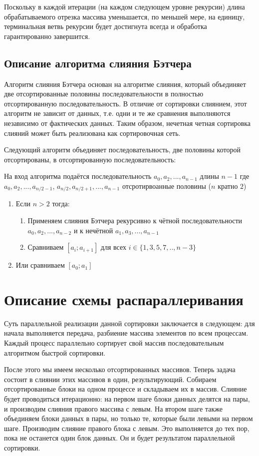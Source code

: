 \documentclass[oneside,final,14pt]{extreport}
\begin{document}
Поскольку в каждой итерации (на каждом следующем уровне рекурсии) длина обрабатываемого отрезка массива уменьшается, по меньшей мере, на единицу, терминальная ветвь рекурсии будет достигнута всегда и обработка гарантированно завершится.        

\section{Описание алгоритма слияния Бэтчера}

Алгоритм слияния Бэтчера  основан на алгоритме слияния, который
объединяет две отсортированные половины последовательности в полностью отсортированную последовательность.
В отличие от сортировки слиянием, этот алгоритм не зависит от данных, т.е. одни и те же сравнения выполняются независимо от фактических данных. Таким образом, нечетная четная сортировка слияний может быть реализована как сортировочная сеть.


Следующий алгоритм объединяет последовательность, две половины которой отсортированы, в отсортированную последовательность:
\bigskip

На вход алгоритма подаётся последовательность \(a_0,a_2,...,a_{n-1}\) длины \(n-1\) где \(a_0,a_2,...,a_{n/2 - 1}\), \(a_{n/2},a_{n/2 + 1},...,a_{n-1}\) отсротирвоанные половины (\(n\) кратно \(2\))
\begin{enumerate}
    \item Если \(n>2\) тогда:
    \begin{enumerate}
        \item Применяем слияния Бэтчера рекурсивно к чётной последовательности \(a_0,a_2,...,a_{n-2}\) и к нечётной \(a_1,a_3,...,a_{n-1}\)
        \item Сравниваем \([a_i;a_{i+1}]\) для всех \(i \in \{1,3,5,7,..,n-3\}\)
    \end{enumerate}
    \item Или сравниваем \([a_0;a_{1}]\)
\end{enumerate}

\chapter{Описание схемы распараллеривания}
Суть параллельной реализации данной сортировки заключается в следующем: для начала выполняется передача, разбиение массива элементов по всем процессам. Каждый процесс параллельно сортирует свой массив последовательным алгоритмом быстрой сортировки.

После этого мы имеем несколько отсортированных массивов. Теперь задача состоит в слиянии этих массивов в один, результирующий. Собираем отсортированные блоки на одном процессе и складываем их в массив.
Слияние будет проводиться итерационно: на первом шаге блоки данных делятся на пары, и производим слияния правого массива с левым. На втором шаге также объединяем блоки данных в пары, но только те, которые были левыми на первом шаге. Производим слияние правого блока с левым. Это выполняется до тех пор, пока не останется один блок данных. Он и будет результатом параллельной сортировки.
\end{document}
